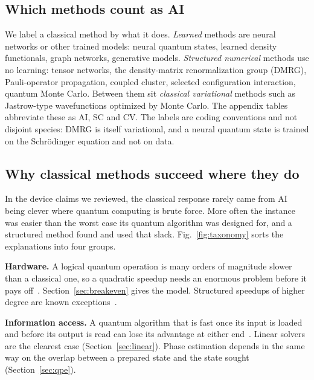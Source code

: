 \subsection{Which methods count as AI}
We label a classical method by what it does. \emph{Learned} methods are neural networks or other trained models: neural quantum states, learned density functionals, graph networks, generative models. \emph{Structured numerical} methods use no learning: tensor networks, the density-matrix renormalization group (DMRG), Pauli-operator propagation, coupled cluster, selected configuration interaction, quantum Monte Carlo. Between them sit \emph{classical variational} methods such as Jastrow-type wavefunctions optimized by Monte Carlo. The appendix tables abbreviate these as AI, SC and CV. The labels are coding conventions and not disjoint species: DMRG is itself variational, and a neural quantum state is trained on the Schr\"odinger equation and not on data.

\subsection{Why classical methods succeed where they do}
\label{sec:why}



In the device claims we reviewed, the classical response rarely came from AI being clever where quantum computing is brute force. More often the instance was easier than the worst case its quantum algorithm was designed for, and a structured method found and used that slack. Fig.~\ref{fig:taxonomy} sorts the explanations into four groups.

\textbf{Hardware.} A logical quantum operation is many orders of magnitude slower than a classical one, so a quadratic speedup needs an enormous problem before it pays off~\cite{hoefler2023,babbush2021}. Section~\ref{sec:breakeven} gives the model. Structured speedups of higher degree are known exceptions~\cite{babbush2025}.

\textbf{Information access.} A quantum algorithm that is fast once its input is loaded and before its output is read can lose its advantage at either end~\cite{aaronson2015,hoefler2023}. Linear solvers are the clearest case (Section~\ref{sec:linear}). Phase estimation depends in the same way on the overlap between a prepared state and the state sought (Section~\ref{sec:qpe}).

